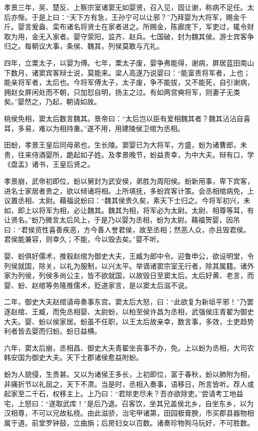 \documentclass[]{article}
\begin{document}
孝景三年，吴、楚反、上察宗室诸窦无如婴贤，召入见，固让谢，称病不足任。太后亦惭。于是上曰：``天下方有急，王孙宁可以让邪？''乃拜婴为大将军，赐金千斤。婴言爰盎、栾布诸名将贤士在家者进之。所赐金，陈廊庑下，军吏过，辄令财取为用，金无入家者。婴守荥阳，监齐、赵兵。七国破，封为魏其侯。游士宾客争归之。每朝议大事，条侯、魏其，列侯莫敢与亢礼。

四年，立栗太子，以婴为傅。七年，栗太子废，婴争弗能得，谢病，屏居蓝田南山下数月，诸窦宾客辩士说，莫能来。梁人高遂乃说婴曰：``能富贵将军者，上也；能亲将军者，太后也。今将军傅太子，太子废，争不能拔，又不能死，自引谢病，拥赵女屏闲处而不朝，只加怼自明，扬主之过。有如两宫奭将军，则妻子无类矣。''婴然之，乃起，朝请如故。

桃侯免相，窦太后数言魏其。景帝曰：``太后岂以臣有爱相魏其者？魏其沾沾自喜耳，多易，难以为相持重。''遂不用，用建陵侯卫绾为丞相。

田蚡，孝景王皇后同母弟也，生长陵。窦婴已为大将军，方盛，蚡为诸曹郎，未贵，往来侍酒婴所，跪起如子姓。及孝景晚节，蚡益贵幸，为中大夫。辩有口，学《盘盂》诸书，王皇后贤之。

孝景崩，武帝初即位，蚡以舅封为武安侯，弟胜为周阳侯。蚡新用事，卑下宾客，进名士家居者贵之，欲以倾诸将相。上所填抚，多蚡宾客计策。会丞相绾病免，上议置丞相、太尉。藉福说蚡曰：``魏其侯贵久矣，素天下士归之。今将军初兴，未如，即上以将军为相，必让魏其。魏其为相，将军必为太尉。太尉、相尊等耳，有让贤名。''蚡乃微言太后风上，于是乃以婴为丞相，蚡为太尉。藉福贺婴，因吊曰：``君侯资性喜善疾恶，方今善人誉君侯，故至丞相；然恶人众，亦且毁君侯。君侯能兼容，则幸久；不能，今以毁去矣。''婴不听。

婴、蚡俱好儒术，推毂赵绾为御史大夫，王臧为郎中令。迎鲁申公，欲设明堂，令列侯就国，除关，以礼为服制，以兴太平。举谪诸窦宗室无行者，除其属籍。诸外家为列侯，列侯多尚公主，皆不欲就国，以故毁日至窦太后。太后好黄、老言，而婴、蚡、赵绾等务隆推儒术，贬道家言，是以窦太后滋不说。

二年，御史大夫赵绾请毋奏事东宫。窦太后大怒，曰：``此欲复为新垣平邪！''乃罢逐赵绾、王臧，而免丞相婴、太尉蚡，以柏至侯许昌为丞相，武强侯庄青翟为御史大夫。婴、蚡以侯家居。蚡虽不任职，以王太后故亲幸，数言事，多效，士吏趋势利者皆去婴而归蚡。蚡日益横。

六年，窦太后崩，丞相昌、御史大夫青翟坐丧事不办，免。上以蚡为丞相，大司农韩安国为御史大夫。天下士郡诸侯愈益附蚡。

蚡为人貌侵，生贵甚。又以为诸侯王多长，上初即位，富于春秋，蚡以肺附为相，非痛折节以礼屈之，天下不肃。当是时，丞相入奏事，语移日，所言皆听。荐人或起家至二千石，权移主上。上乃曰：``君除吏尽未？吾亦欲除吏。''尝请考工地益宅，上怒曰：``遂取武库！''是后乃退。召客饮，坐其兄盖侯北乡，自坐东乡，以为汉相尊，不可以兄故私桡。由此滋骄，治宅甲诸第，田园极膏腴，市买郡县器物相属于道。前堂罗钟鼓，立曲旃；后房妇女以百数。诸奏珍物狗马玩好，不可胜数。
\end{document}
